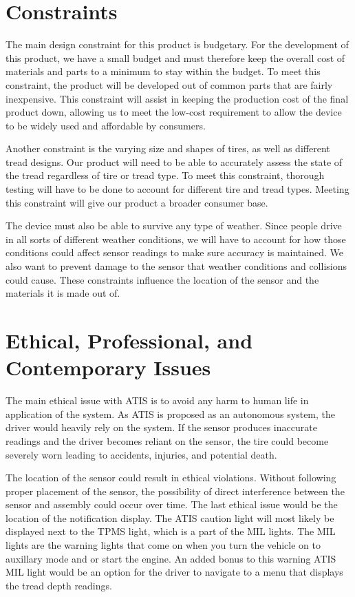 \documentclass[11pt]{IEEEtran}
\begin{document}
	\section{Constraints}
		The main design constraint for this product is budgetary. For the development of this product, we have a small budget and must therefore keep the overall cost of materials and parts to a minimum to stay within the budget. To meet this constraint, the product will be developed out of common parts that are fairly inexpensive. This constraint will assist in keeping the production cost of the final product down, allowing us to meet the low-cost requirement to allow the device to be widely used and affordable by consumers. 

		Another constraint is the varying size and shapes of tires, as well as different tread designs. Our product will need to be able to accurately assess the state of the tread regardless of tire or tread type. To meet this constraint, thorough testing will have to be done to account for different tire and tread types. Meeting this constraint will give our product a broader consumer base.

		The device must also be able to survive any type of weather. Since people drive in all sorts of different weather conditions, we will have to account for how those conditions could affect sensor readings to make sure accuracy is maintained. We also want to prevent damage to the sensor that weather conditions and collisions could cause.  These constraints influence the location of the sensor and the materials it is made out of.

	\section{Ethical, Professional, and Contemporary Issues}
		The main ethical issue with ATIS is to avoid any harm to human life in application of the system. As ATIS is proposed as an autonomous system, the driver would heavily rely on the system. If the sensor produces inaccurate readings and the driver becomes reliant on the sensor, the tire could become severely worn leading to accidents, injuries, and potential death. 

		The location of the sensor could result in ethical violations. Without following proper placement of the sensor, the possibility of direct interference between the sensor and assembly could occur over time. The last ethical issue would be the location of the notification display. The ATIS caution light will most likely be displayed next to the TPMS light, which is a part of the MIL lights. The MIL lights are the warning lights that come on when you turn the vehicle on to auxillary mode and or start the engine. An added bonus to this warning ATIS MIL light would be an option for the driver to navigate to a menu that displays the tread depth readings.
\end{document}
